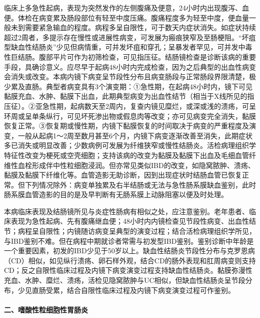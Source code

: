 临床上多急性起病，表现为突然发作的左侧腹痛及便意，24小时内出现腹泻、血便。体检在病变累及肠段部位有轻至中度压痛。腹痛程度多为轻至中度，便血量一般未到需要紧急输血的程度。病程多呈自限性，可于数天内症状消失。如症状持续超过2周者，多提示存在慢性或进展性病变，可发展为瘢痕狭窄及至肠梗阻。“坏疽型缺血性结肠炎”少见但病情重，可并发坏疽和穿孔；呈暴发者罕见，可并发中毒性巨结肠。腹部平片可作为初筛检查，可见指压征。结肠镜检查是诊断该病的重要手段，具确诊意义。应尽早于起病48小时内完成检查，因为之后典型的出血性病变会消失或改变。本病内镜下病变呈节段性分布且病变肠段与正常肠段界限清楚，极少累及直肠。典型者病变具有3个演变期：①急性期，在起病48小时内，镜下可见黏膜充血、水肿、黏膜下出血，此期典型病变为出血性结节（相当于X线所见的指压征）。②亚急性期，起病数天至2周内，复查内镜见糜烂，或深或浅的溃疡，可呈环周或呈单条纵行，可见坏死渗出物或假息肉等改变；亦可见病变完全消失，黏膜恢复正常。③恢复期或慢性期，内镜下黏膜恢复的时间取决于病变的严重程度及演变，一般从起病1～2周至数月甚至6个月，内镜下病变逐渐改善至消失，此期症状多已消失或明显改善；少数病例可发展为纤维狭窄或慢性结肠炎。活检病理组织学特征性改变为梗死或空壳细胞；支持该病的改变为黏膜及黏膜下出血及毛细血管纤维性血栓形成伴中性粒细胞浸润。但亦常见类似IBD的改变，如隐窝脓肿、溃疡、黏膜及黏膜下纤维化等。血管造影无助诊断，因到出现症状时结肠血管已恢复正常。但下列情况除外：病变单独累及右半结肠或无法与急性肠系膜缺血鉴别，此时肠系膜血管造影的目的是及早判断有无肠系膜上动脉阻塞以便及时处理。

本病临床表现及结肠镜所见与炎症性肠病有相似之处，应注意鉴别。老年患者、临床表现为急性起病、先有腹痛继血便；48小时内内镜检查见节段性病变、出血性结节；病程呈自限性；内镜随访病变呈典型的演变过程；结合活检病理组织学所见，与IBD鉴别不难。但在病程中期就诊者常需与初发型IBD鉴别。鉴别诊断中年龄是一个重要因素，初发的IBD少见于50岁以上。缺血性结肠炎节段性分布与克罗恩病（CD）相似，如见纵行溃疡、卵石样外观，结合CD的肠外表现和肛周病变则支持CD；反之自限性临床过程及内镜下病变演变过程支持缺血性结肠炎。黏膜弥漫性充血、水肿、糜烂、溃疡，活检见隐窝脓肿与UC相似，但缺血性结肠炎呈节段分布，少见直肠受累，结合自限性临床过程及内镜下病变演变过程可作鉴别。

\paragraph{二、嗜酸性粒细胞性胃肠炎}

